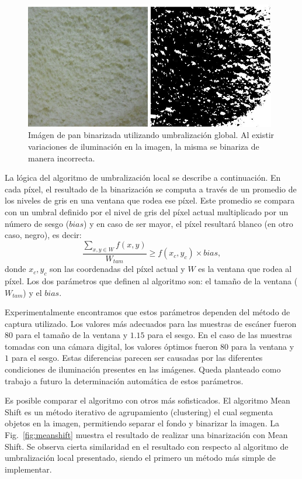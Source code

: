 \begin{figure}[h!]
\centering
\includegraphics[width=11cm]{figures/segmal}
\caption[Imágen de pan binarizada utilizando umbralización global.]{Imágen de pan binarizada utilizando umbralización global. Al existir variaciones de iluminación en la imagen, la misma se binariza de manera incorrecta.}
\label{fig:segmal}
\end{figure}


La lógica del algoritmo de umbralización local se describe a continuación.
En cada píxel, el resultado de la binarización se computa a través de un promedio de los niveles de gris en una ventana que rodea ese píxel. Este promedio se compara con un umbral definido por el nivel de gris del píxel actual multiplicado por un número de sesgo ($bias$) y en caso de ser mayor, el píxel resultará blanco (en otro caso, negro), es decir:
\begin{equation}
\frac{\sum_{x,y \in W} f(x,y) }{W_{tam}} \geq f(x_{c},y_{c}) \times bias,
\label{eqn:white}
\end{equation}
donde $x_{c},y_{c}$ son las coordenadas del píxel actual y  $W$ es la ventana que rodea al píxel. Los dos parámetros que definen al algoritmo son: el tamaño de la ventana ($W_{tam}$) y el $bias$. 

Experimentalmente encontramos que estos parámetros dependen del método de captura utilizado. Los valores más adecuados para las muestras de escáner fueron $80$ para el tamaño de la ventana y $1.15 $ para el sesgo. En el caso de las muestras tomadas con una cámara digital, los valores óptimos fueron $80$ para la ventana y $1$ para el sesgo.  Estas diferencias parecen ser causadas por las diferentes condiciones de iluminación presentes en las imágenes. Queda planteado como trabajo a futuro la determinación automática de estos parámetros.

Es posible comparar el algoritmo con otros más sofisticados.
El algoritmo Mean Shift \cite{Comaniciu2002} es un método iterativo de agrupamiento (clustering) el cual segmenta objetos en la imagen, permitiendo separar el fondo y binarizar la imagen.
La Fig.~\ref{fig:meanshift} muestra el resultado de realizar una binarización con Mean Shift.
Se observa cierta similaridad en el resultado con respecto al algoritmo de umbralización local presentado, siendo el primero un método más simple de implementar.

